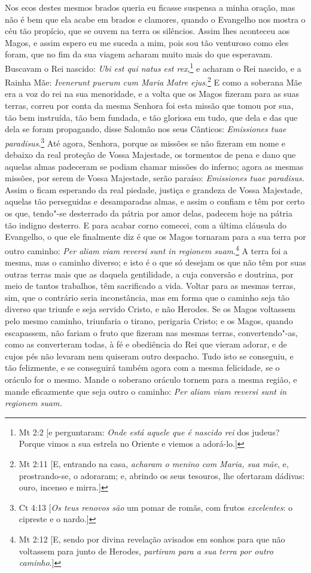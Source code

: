 Nos ecos destes mesmos brados queria eu ficasse suspensa a minha oração,
mas não é bem que ela acabe em brados e clamores, quando o Evangelho nos
mostra o céu tão propício, que se ouvem na terra os silêncios. Assim
lhes aconteceu aos Magos, e assim espero eu me suceda a mim, pois sou
tão venturoso como eles foram, que no fim da sua viagem acharam muito
mais do que esperavam. Buscavam o Rei nascido: \emph{Ubi est qui natus
est rex},\footnote{Mt 2:2 [e perguntaram: \emph{Onde está aquele que é nascido rei} dos judeus? Porque vimos a sua estrela no Oriente e viemos a adorá-lo.]} e acharam o Rei nascido, e a Rainha Mãe:
\emph{Ivenerunt puerum cum Maria Matre ejus}.\footnote{Mt 2:11 [E, entrando na casa, \emph{acharam o menino com Maria, sua mãe}, e, prostrando-se, o adoraram;
e, abrindo os seus tesouros, lhe ofertaram dádivas: ouro, incenso e mirra.]} E como a
soberana Mãe era a voz do rei na sua menoridade, e a volta que os Magos
fizeram para as suas terras, correu por conta da mesma Senhora foi esta
missão que tomou por sua, tão bem instruída, tão bem fundada, e tão
gloriosa em tudo, que dela e das que dela se foram propagando, disse
Salomão nos seus Cânticos: \emph{Emissiones tuae paradisus}.\footnote{Ct 4:13 [\emph{Os teus renovos são} um pomar de romãs, com frutos \emph{excelentes}: o cipreste e o nardo.]}
Até agora, Senhora, porque as missões se
não fizeram em nome e debaixo da real proteção de Vossa Majestade, os
tormentos de pena e dano que aquelas almas padeceram se podiam chamar
missões do inferno; agora as mesmas missões, por serem de Vossa
Majestade, serão paraíso: \emph{Emissiones tuae paradisus.} Assim o
ficam esperando da real piedade, justiça e grandeza de Vossa Majestade,
aquelas tão perseguidas e desamparadas almas, e assim o confiam e têm
por certo os que, tendo"-se desterrado da pátria por amor delas, padecem
hoje na pátria tão indigno desterro. E para acabar corno comecei, com a
última cláusula do Evangelho, o que ele finalmente diz é que os Magos
tornaram para a sua terra por outro caminho: \emph{Per aliam viam
reversi sunt in regionem suam}.\footnote{Mt 2:12 [E, sendo por divina revelação avisados em sonhos para que não voltassem para junto de Herodes, \emph{partiram para a sua terra por outro caminho}.]} A terra foi a mesma, mas o
caminho diverso; e isto é o que só desejam os que não têm por suas
outras terras mais que as daquela gentilidade, a cuja conversão e
doutrina, por meio de tantos trabalhos, têm sacrificado a vida. Voltar
para as mesmas terras, sim, que o contrário seria inconstância, mas em
forma que o caminho seja tão diverso que triunfe e seja servido Cristo,
e não Herodes. Se os Magos voltassem pelo mesmo caminho, triunfaria o
tirano, perigaria Cristo; e os Magos, quando escapassem, não fariam o
fruto que fizeram nas mesmas terras, convertendo"-as, como as converteram
todas, à fé e obediência do Rei que vieram adorar, e de cujos pés não
levaram nem quiseram outro despacho. Tudo isto se conseguiu, e tão
felizmente, e se conseguirá também agora com a mesma felicidade, se o
oráculo for o mesmo. Mande o soberano oráculo tornem para a mesma
região, e mande eficazmente que seja outro o caminho: \emph{Per aliam
viam reversi sunt in regionem suam.}

